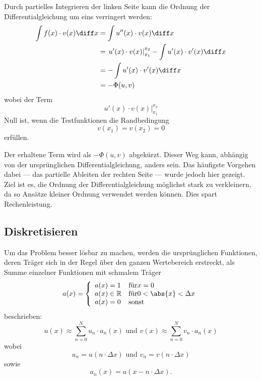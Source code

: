 Durch partielles Integrieren der linken Seite kann die Ordnung der Differentialgleichung um eins verringert werden:
\begin{align}
    \int f(x) \cdot v(x) \diff x &= \int u''(x) \cdot v(x) \diff x \\
                                 &= \left. u'(x) \cdot v(x) \right|_{x_1}^{x_2} - \int u'(x) \cdot v'(x) \diff x \\
                                 &= - \int u'(x) \cdot v'(x) \diff x \\
                                 &= - \Phi(u, v)
\end{align}
wobei der Term
\begin{equation}
    \left. u'(x) \cdot v(x) \right|_{x_1}^{x_2}
\end{equation}
Null ist, wenn die Testfunktionen die Randbedingung
\begin{equation}
    v(x_1) = v(x_2) = 0
\end{equation}
erfüllen. %

Der erhaltene Term wird als $-\Phi(u, v)$ abgekürzt.
Dieser Weg kann, abhängig von der ursprünglichen Differentialgleichung, anders sein.
Das häufigste Vorgehen dabei --- das partielle Ableiten der rechten Seite --- wurde jedoch hier gezeigt.
Ziel ist es, die Ordnung der Differentialgleichung möglichst stark zu verkleinern, da so Ansätze kleiner Ordnung verwendet werden können.
Dies spart Rechenleistung.


\subsection{Diskretisieren\label{fem:1d:diskretisieren}}
Um das Problem besser lösbar zu machen, werden die ursprünglichen Funktionen, deren Träger sich in der Regel über den ganzen Wertebereich erstreckt, als Summe einzelner Funktionen mit schmalem Träger 
\begin{equation}
    a(x) = \left\{ \begin{array} {ll}
        a(x) = 1            & \text{für} x = 0 \\
        a(x) \in \mathbb{R} & \text{für} 0 < \abs{x} < \Delta x \\
        a(x) = 0            & \text{sonst} 
    \end{array}\right.
\end{equation}
beschrieben:
\begin{equation}
    u(x) \approx \sum_{n=0}^{N}{u_n \cdot a_n(x)} \text{ und } v(x) \approx \sum_{n=0}^{N}{v_n \cdot a_n(x)}
\end{equation}
wobei 
\begin{equation}
    u_n = u(n \cdot \Delta x) \text{ und } v_n = v(n \cdot \Delta x)
\end{equation}
sowie 
\begin{equation}
    a_n(x) = a(x - n \cdot \Delta x).
\end{equation}

